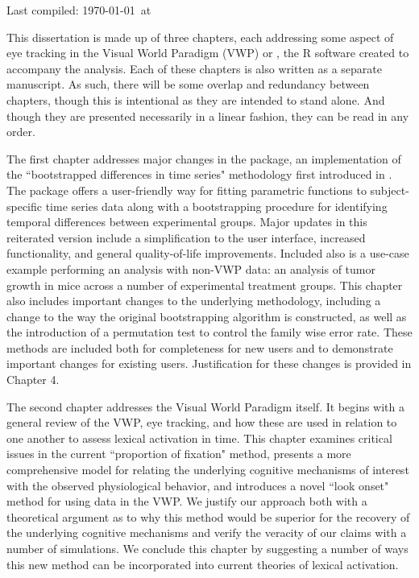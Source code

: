 
Last compiled: \today \  at \currenttime

This dissertation is made up of three chapters, each addressing some aspect of eye tracking in the Visual World Paradigm (VWP) or , the R software created to accompany the analysis. Each of these chapters is also written as a separate manuscript. As such, there will be some overlap and redundancy between chapters, though this is intentional as they are intended to stand alone. And though they are presented necessarily in a linear fashion, they can be read in any order.

The first chapter addresses major changes in the  package, an implementation of the ``bootstrapped differences in time series" methodology first introduced in \citet{oleson2017detecting}. The package offers a user-friendly way for fitting parametric functions to subject-specific time series data along with a bootstrapping procedure for identifying temporal differences between experimental groups. Major updates in this reiterated version include a simplification to the user interface, increased functionality, and general quality-of-life improvements. Included also is a use-case example performing an analysis with non-VWP data: an analysis of tumor growth in mice across a number of experimental treatment groups. This chapter also includes important changes to the underlying methodology, including a change to the way the original bootstrapping algorithm is constructed, as well as the introduction of a permutation test to control the family wise error rate. These methods are included both for completeness for new users and to demonstrate important changes for existing users. Justification for these changes is provided in Chapter 4. 

The second chapter addresses the Visual World Paradigm itself. It begins with a general review of the VWP, eye tracking, and how these are used in relation to one another to assess lexical activation in time. This chapter examines critical issues in the current ``proportion of fixation" method, presents a more comprehensive model for relating the underlying cognitive mechanisms of interest with the observed physiological behavior, and introduces a novel ``look onset" method for using data in the VWP. We justify our approach both with a theoretical argument as to why this method would be superior for the recovery of the underlying cognitive mechanisms and verify the veracity of our claims with a number of simulations. We conclude this chapter by suggesting a number of ways this new method can be incorporated into current theories of lexical activation.

